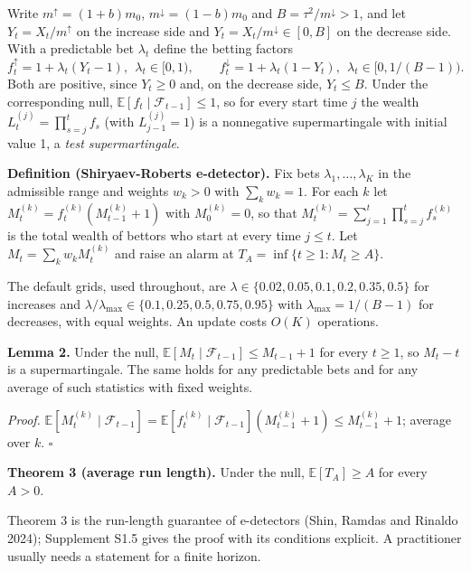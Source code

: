 \documentclass[
]{article}
\begin{document}
Write \(m^{\uparrow} = (1+b)m_0\), \(m^{\downarrow} = (1-b)m_0\) and
\(B = \tau^2/m^{\downarrow} > 1\), and let \(Y_t = X_t/m^{\uparrow}\) on
the increase side and \(Y_t = X_t/m^{\downarrow} \in [0, B]\) on the
decrease side. With a predictable bet \(\lambda_t\) define the betting
factors \[
f_t^{\uparrow} = 1 + \lambda_t (Y_t - 1), \ \ \lambda_t \in [0, 1), \qquad f_t^{\downarrow} = 1 + \lambda_t (1 - Y_t), \ \ \lambda_t \in \big[0, 1/(B-1)\big).
\] Both are positive, since \(Y_t \ge 0\) and, on the decrease side,
\(Y_t \le B\). Under the corresponding null,
\(\mathbb{E}[f_t \mid \mathcal{F}_{t-1}] \le 1\), so for every start
time \(j\) the wealth \(L_t^{(j)} = \prod_{s=j}^{t} f_s\) (with
\(L_{j-1}^{(j)} = 1\)) is a nonnegative supermartingale with initial
value 1, a \emph{test supermartingale}.

\textbf{Definition (Shiryaev-Roberts e-detector).} Fix bets
\(\lambda_1, \dots, \lambda_K\) in the admissible range and weights
\(w_k > 0\) with \(\sum_k w_k = 1\). For each \(k\) let
\(M_t^{(k)} = f_t^{(k)}(M_{t-1}^{(k)} + 1)\) with \(M_0^{(k)} = 0\), so
that \(M_t^{(k)} = \sum_{j=1}^{t} \prod_{s=j}^{t} f_s^{(k)}\) is the
total wealth of bettors who start at every time \(j \le t\). Let
\(M_t = \sum_k w_k M_t^{(k)}\) and raise an alarm at
\(T_A = \inf\lbrace t \ge 1 : M_t \ge A \rbrace\).

The default grids, used throughout, are
\(\lambda \in \lbrace 0.02, 0.05, 0.1, 0.2, 0.35, 0.5 \rbrace\) for
increases and
\(\lambda/\lambda_{\max} \in \lbrace 0.1, 0.25, 0.5, 0.75, 0.95 \rbrace\)
with \(\lambda_{\max} = 1/(B-1)\) for decreases, with equal weights. An
update costs \(O(K)\) operations.

\textbf{Lemma 2.} Under the null,
\(\mathbb{E}[M_t \mid \mathcal{F}_{t-1}] \le M_{t-1} + 1\) for every
\(t \ge 1\), so \(M_t - t\) is a supermartingale. The same holds for any
predictable bets and for any average of such statistics with fixed
weights.

\emph{Proof.}
\(\mathbb{E}[M_t^{(k)} \mid \mathcal{F}_{t-1}] = \mathbb{E}[f_t^{(k)} \mid \mathcal{F}_{t-1}](M_{t-1}^{(k)} + 1) \le M_{t-1}^{(k)} + 1\);
average over \(k\). \(\square\)

\textbf{Theorem 3 (average run length).} Under the null,
\(\mathbb{E}[T_A] \ge A\) for every \(A > 0\).

Theorem 3 is the run-length guarantee of e-detectors (Shin, Ramdas and
Rinaldo 2024); Supplement S1.5 gives the proof with its conditions
explicit. A practitioner usually needs a statement for a finite horizon.
\end{document}
